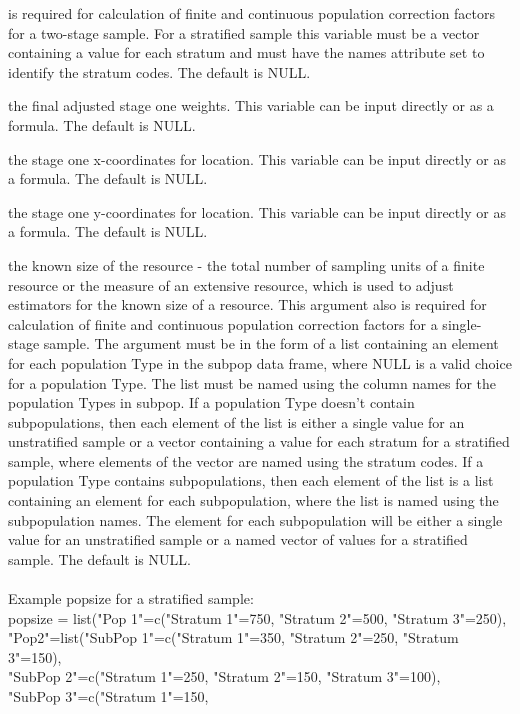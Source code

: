 \begin{Arguments}
\begin{ldescription}
is required for calculation of finite and continuous population 
correction factors for a two-stage sample.  For a stratified sample 
this variable must be a vector containing a value for each stratum and
must have the names attribute set to identify the stratum codes.  The
default is NULL.
\item[\code{wgt1}] the final adjusted stage one weights.  This variable can be input 
directly or as a formula.  The default is NULL.
\item[\code{xcoord1}] the stage one x-coordinates for location.  This variable can be 
input directly or as a formula.  The default is NULL.
\item[\code{ycoord1}] the stage one y-coordinates for location.  This variable can be 
input directly or as a formula.  The default is NULL.
\item[\code{popsize}] the known size of the resource - the total number of sampling 
units of a finite resource or the measure of an extensive resource,
which is used to adjust estimators for the known size of a resource.
This argument also is required for calculation of finite and
continuous population correction factors for a single-stage sample.   
The argument must be in the form of a list containing an element for   
each population Type in the subpop data frame, where NULL is a valid   
choice for a population Type.  The list must be named using the column  
names for the population Types in subpop. If a population Type doesn't  
contain subpopulations, then each element of the list is either a  
single value for an unstratified sample or a vector containing a value  
for each stratum for a stratified sample, where elements of the vector
are named using the stratum codes.  If a population Type contains 
subpopulations, then each element of the list is a list containing an 
element for each subpopulation, where the list is named using the 
subpopulation names.  The element for each subpopulation will be 
either a single value for an unstratified sample or a named vector of 
values for a stratified sample.  The default is NULL.\\\\
Example popsize for a stratified sample:\\
popsize = list("Pop 1"=c("Stratum 1"=750, "Stratum 2"=500,
"Stratum 3"=250),\\ "Pop2"=list("SubPop 1"=c("Stratum 1"=350,
"Stratum 2"=250, "Stratum 3"=150),\\ "SubPop 2"=c("Stratum 1"=250,
"Stratum 2"=150, "Stratum 3"=100),\\ "SubPop 3"=c("Stratum 1"=150,

\end{ldescription}
\end{Arguments}
